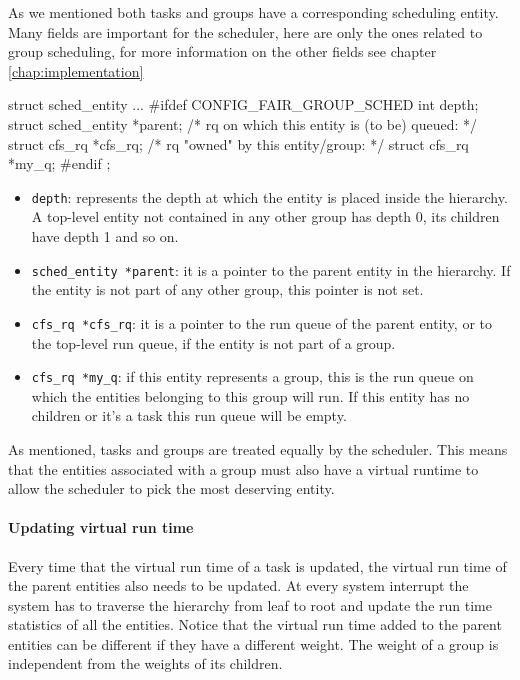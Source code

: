 As we mentioned both tasks and groups have a corresponding scheduling entity. Many fields are important for the scheduler, here are only the ones related to group scheduling, for more information on the other fields see chapter \ref{chap:implementation}

\begin{code}
struct sched_entity {
...
#ifdef CONFIG_FAIR_GROUP_SCHED
	int				depth;
	struct sched_entity		*parent;
	/* rq on which this entity is (to be) queued: */
	struct cfs_rq			*cfs_rq;
	/* rq "owned" by this entity/group: */
	struct cfs_rq			*my_q;
#endif
};
\end{code}
\begin{itemize}
    \item \verb|depth|: represents the depth at which the entity is placed inside the hierarchy. A top-level entity not contained in any other group has depth 0, its children have depth 1 and so on.
    \item \verb|sched_entity *parent|: it is a pointer to the parent entity in the hierarchy. If the entity is not part of any other group, this pointer is not set.
    \item \verb|cfs_rq *cfs_rq|: it is a  pointer to the run queue of the parent entity, or to the top-level run queue, if the entity is not part of a group.
    \item \verb|cfs_rq *my_q|: if this entity represents a group, this is the run queue on which the entities belonging to this group will run. If this entity has no children or it's a task this run queue will be empty.
\end{itemize}

As mentioned, tasks and groups are treated equally by the scheduler. This means that the entities associated with a group must also have a virtual runtime to allow the scheduler to pick the most deserving entity.

\paragraph{Updating virtual run time}
Every time that the virtual run time of a task is updated, the virtual run time of the parent entities also needs to be updated. At every system interrupt the system has to traverse the hierarchy from leaf to root and update the run time statistics of all the entities. Notice that the virtual run time added to the parent entities can be different if they have a different weight. The weight of a group is independent from the weights of its children.

